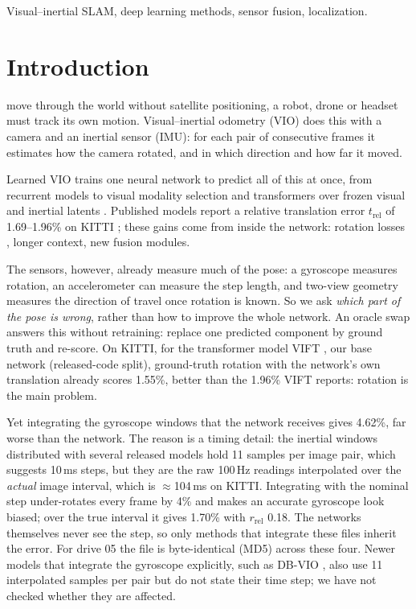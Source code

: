 \documentclass[letterpaper,journal]{IEEEtran}
\begin{document}
\begin{IEEEkeywords}
Visual--inertial SLAM, deep learning methods, sensor fusion, localization.
\end{IEEEkeywords}

\section{Introduction}

 move through the world without satellite positioning, a robot, drone or headset must track its own motion. Visual--inertial odometry (VIO) does this with a camera and an inertial sensor (IMU): for each pair of consecutive frames it estimates how the camera rotated, and in which direction and how far it moved.

Learned VIO trains one neural network to predict all of this at once, from recurrent models \cite{Clark2017,Han2019} to visual modality selection \cite{Yang2022} and transformers over frozen visual and inertial latents \cite{Kurt2024}. Published models report a relative translation error $t_\mathrm{rel}$ of 1.69--1.96\% on KITTI \cite{Kurt2024,Ma2026,Wan2026}; these gains come from inside the network: rotation losses \cite{Chen2022}, longer context, new fusion modules.

The sensors, however, already measure much of the pose: a gyroscope measures rotation, an accelerometer can measure the step length, and two-view geometry measures the direction of travel once rotation is known. So we ask \emph{which part of the pose is wrong}, rather than how to improve the whole network. An oracle swap answers this without retraining: replace one predicted component by ground truth and re-score. On KITTI, for the transformer model VIFT \cite{Kurt2024}, our base network (released-code split), ground-truth rotation with the network's own translation already scores 1.55\%, better than the 1.96\% VIFT reports: rotation is the main problem.

Yet integrating the gyroscope windows that the network receives gives 4.62\%, far worse than the network. The reason is a timing detail: the inertial windows distributed with several released models \cite{Yang2022,Kurt2024,Chen2023NASVIO,Park2024ULVIO} hold 11 samples per image pair, which suggests 10\,ms steps, but they are the raw 100\,Hz readings interpolated over the \emph{actual} image interval, which is $\approx$104\,ms on KITTI. Integrating with the nominal step under-rotates every frame by 4\% and makes an accurate gyroscope look biased; over the true interval it gives 1.70\% with $r_\mathrm{rel}$ 0.18. The networks themselves never see the step, so only methods that integrate these files inherit the error. For drive 05 the file is byte-identical (MD5) across these four. Newer models that integrate the gyroscope explicitly, such as DB-VIO \cite{Wan2026}, also use 11 interpolated samples per pair but do not state their time step; we have not checked whether they are affected.
\end{document}
